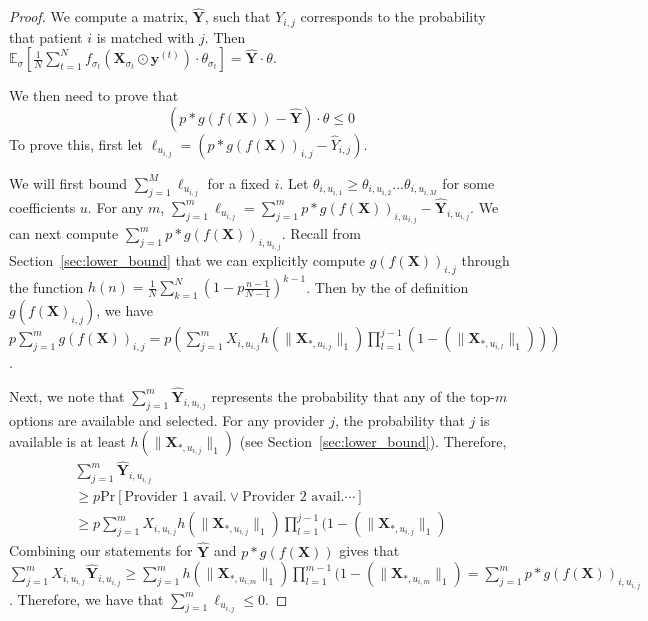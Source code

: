 \thmlowerbound*
\begin{proof}
    We compute a matrix, $\hat{\mathbf{Y}}$, such that $Y_{i,j}$ corresponds to the probability that patient $i$ is matched with $j$. 
    Then $\mathbb{E}_{\sigma}[\frac{1}{N} \sum_{t=1}^{N} f_{\sigma_{t}}\left(\mathbf{X}_{\sigma_{t}} \odot \mathbf{y}^{(t)}\right)  \cdot \theta_{\sigma_{t}}] = \hat{\mathbf{Y}} \cdot \theta$. 
    
    We then need to prove that
    \begin{equation}
        (p*g(f(\mathbf{X}))-\hat{\mathbf{Y}}) \cdot \theta \leq 0
    \end{equation}
    To prove this, first let $\ell_{u_{i,j}} = (p*g(f(\mathbf{X}))_{i,j} - \hat{Y}_{i,j})$. 
    
    We will first bound $\sum_{j=1}^{M} \ell_{u_{i,j}}$ for a fixed $i$. 
    Let $\theta_{i,u_{i,1}} \geq \theta_{i,u_{i,2}} \ldots \theta_{i,u_{i,M}}$ for some coefficients $u$. 
    For any $m$, $\sum_{j=1}^{m} \ell_{u_{i,j}} = \sum_{j=1}^{m} p*g(f(\mathbf{X}))_{i,u_{i,j}}-\hat{\mathbf{Y}}_{i,u_{i,j}}$. 
    We can next compute $\sum_{j=1}^{m} p*g(f(\mathbf{X}))_{i,u_{i,j}}$. 
    Recall from Section~\ref{sec:lower_bound} that we can explicitly compute $g(f(\mathbf{X}))_{i,j}$ through the function $h(n) = \frac{1}{N} \sum_{k=1}^{N} (1-p \frac{n-1}{N-1})^{k-1}$. 
    Then by the of definition $g(f(\mathbf{X})_{i,j})$, we have $p \sum_{j=1}^{m} g(f(\mathbf{X}))_{i,j} = p (\sum_{j=1}^{m} X_{i,u_{i,j}} h(\lVert \mathbf{X}_{*,u_{i,j}} \rVert_{1}) \prod_{l=1}^{j-1} (1-(\lVert \mathbf{X}_{*,u_{i,l}} \rVert_{1})))$. 
    
    Next, we note that $\sum_{j=1}^{m} \hat{\mathbf{Y}}_{i,u_{i,j}}$ represents the probability that any of the top-$m$ options are available and selected. 
    For any provider $j$, the probability that $j$ is available is at least $h(\lVert \mathbf{X}_{*,u_{i,j}} \rVert_{1})$ (see Section~\ref{sec:lower_bound}). 
    Therefore, 
    \begin{align}
        \sum_{j=1}^{m} \hat{\mathbf{Y}}_{i,u_{i,j}} \\ 
        \geq p \mathrm{Pr}[\text{Provider 1 avail.} \vee \text{Provider 2 avail.} \cdots] \\ \geq p \sum_{j=1}^{m} X_{i,u_{i,j}} h(\lVert \mathbf{X}_{*,u_{i,j}} \rVert_{1}) \prod_{l=1}^{j-1} (1-(\lVert \mathbf{X}_{*,u_{i,j}} \rVert_{1})
    \end{align}
    Combining our statements for $\hat{\mathbf{Y}}$ and $p *g(f(\mathbf{X}))$ gives that $\sum_{j=1}^{m} X_{i,u_{i,j}} \hat{\mathbf{Y}}_{i,u_{i,j}} \geq \sum_{j=1}^{m} h(\lVert \mathbf{X}_{*,u_{i,m}} \rVert_{1}) \prod_{l=1}^{m-1} (1-(\lVert \mathbf{X}_{*,u_{i,m}} \rVert_{1}) = \sum_{j=1}^{m} p*g(f(\mathbf{X}))_{i,u_{i,j}}$. 
    Therefore, we have that $\sum_{j=1}^{m} \ell_{u_{i,j}} \leq 0$. 


\end{proof}
